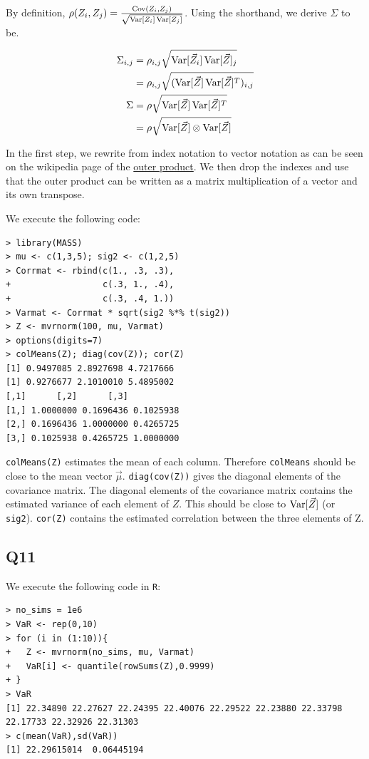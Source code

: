 By definition, $\rho(Z_i,Z_j) = \frac{\operatorname{\text{Cov}}(Z_i,Z_j)}{\sqrt{\operatorname{\text{Var}}[Z_i]\operatorname{\text{Var}}[Z_j]}}$. Using the shorthand, we derive $\Sigma$ to be.

\begin{align}
\Sigma_{i,j} & = \rho_{i,j} \sqrt{\operatorname{\text{Var}}[\vec{Z}_i]\operatorname{\text{Var}}[\vec{Z}]_j} \\
             & = \rho_{i,j} \sqrt{(\operatorname{\text{Var}}[\vec{Z}]\operatorname{\text{Var}}[\vec{Z}]^{T})_{i,j}} \\
\Sigma       & = \rho \sqrt{\operatorname{\text{Var}}[\vec{Z}]\operatorname{\text{Var}}[\vec{Z}]^{T}} \\
             & = \rho \sqrt{\operatorname{\text{Var}}[\vec{Z}] \otimes \operatorname{\text{Var}}[\vec{Z}]}
\end{align}

In the first step, we rewrite from index notation to vector notation as can be seen on the wikipedia page of the \href{https://en.wikipedia.org/wiki/Outer_product}{outer product}. We then drop the indexes and use that the outer product can be written as a matrix multiplication of a vector and its own transpose.

We execute the following code:

\begin{verbatim}
> library(MASS)
> mu <- c(1,3,5); sig2 <- c(1,2,5)
> Corrmat <- rbind(c(1., .3, .3),
+                  c(.3, 1., .4),
+                  c(.3, .4, 1.))
> Varmat <- Corrmat * sqrt(sig2 %*% t(sig2))
> Z <- mvrnorm(100, mu, Varmat)
> options(digits=7)
> colMeans(Z); diag(cov(Z)); cor(Z)
[1] 0.9497085 2.8927698 4.7217666
[1] 0.9276677 2.1010010 5.4895002
[,1]      [,2]      [,3]
[1,] 1.0000000 0.1696436 0.1025938
[2,] 0.1696436 1.0000000 0.4265725
[3,] 0.1025938 0.4265725 1.0000000
\end{verbatim}

\verb|colMeans(Z)| estimates the mean of each column. Therefore \verb|colMeans| should be close to the mean vector $\vec{\mu}$.
\verb|diag(cov(Z))| gives the diagonal elements of the covariance matrix. The diagonal elements of the covariance matrix contains the estimated variance of each element of $Z$. This should be close to $\operatorname{\text{Var}}[\vec{Z}]$ (or \verb|sig2|).
\verb|cor(Z)| contains the estimated correlation between the three elements of Z.

\subsection*{Q11}

We execute the following code in \verb|R|:

\begin{verbatim}
> no_sims = 1e6
> VaR <- rep(0,10)
> for (i in (1:10)){
+   Z <- mvrnorm(no_sims, mu, Varmat)
+   VaR[i] <- quantile(rowSums(Z),0.9999)
+ }
> VaR
[1] 22.34890 22.27627 22.24395 22.40076 22.29522 22.23880 22.33798 22.17733 22.32926 22.31303
> c(mean(VaR),sd(VaR))
[1] 22.29615014  0.06445194
\end{verbatim}

